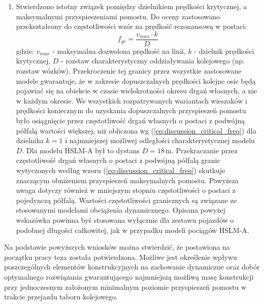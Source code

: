 \begin{enumerate}
\item Stwierdzono istotny związek pomiędzy dzielnikiem prędkości krytycznej, a maksymalnymi przyspieszeniami pomostu. Do oceny zastosowano przekształcony do częstotliwości wzór na prędkość rezonansową w postaci:
\begin{equation} \label{eq:discussion_critical_freq}
	f_{gr} = \frac{v_{max}\cdot k}{D} 
\end{equation}
gdzie: $v_{max}$ - maksymalna dozwolona prędkość na linii, $k$ - dzielnik prędkości krytycznej, $D$ - rozstaw charakterystyczny oddziaływania kolejowego (np. rozstaw wózków). Przekroczenie tej granicy przez wszystkie zastosowane modele gwarantuje, że w zakresie dopuszczalnych prędkości kolejne osie będą pojawiać się na obiekcie w czasie wielokrotności okresu drgań własnych, a nie w każdym okresie. We wszystkich rozpatrywanych wariantach wieszaków i prędkości koniecznym do uzyskania dopuszczalnych przyspieszeń pomostu było osiągnięcie przez częstotliwość drgań własnych o postaci z podwójną półfalą wartości większej, niż obliczona wg (\ref{eq:discussion_critical_freq}) dla dzielnika $k=1$ i najmniejszej możliwej odległości charakterystycznej modelu $D$. Dla modelu HSLM-A był to dystans $D=18\,\mathrm{m}$. Przekraczanie przez częstotliwość drgań własnych o postaci z podwójną półfalą granic wytyczonych według wzoru (\ref{eq:discussion_critical_freq}) skutkuje znaczącym obniżeniem przyspieszeń maksymalnych pomostu. Powyższa uwaga dotyczy również w mniejszym stopniu częstotliwości o postaci z pojedynczą półfalą. Wartości częstotliwości granicznych są związane ze stosowanymi modelami obciążenia dynamicznego. Opisana powyżej wskazówka powinna byś stosowana wyłącznie dla zestawu pojazdów o podobnej długości całkowitej, jak w przypadku modeli pociągów HSLM-A.




\end{enumerate}

Na podstawie powyższych wniosków można stwierdzić, że postawiona na początku pracy teza została potwierdzona. Możliwe jest określenie wpływu poszczególnych elementów konstrukcyjnych na zachowanie dynamiczne oraz dobór optymalnego rozwiązania gwarantującego najmniejszą możliwą masę konstrukcji przy jednoczesnym założonym minimalnym poziomie przyspieszeń pomostu w trakcie przejazdu taboru kolejowego.

